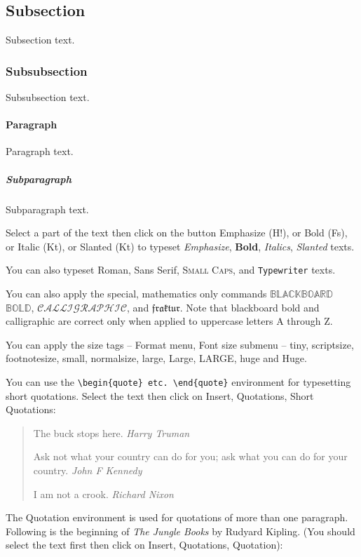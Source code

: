 \documentclass[11pt,a4paper]{amsart}
\theoremstyle{plain}
\numberwithin{equation}{section}
\theoremstyle{definition}
\begin{document}
\subsection{Subsection}
Subsection text.

\subsubsection{Subsubsection}
Subsubsection text.

\paragraph{Paragraph}
Paragraph text.

\subparagraph{Subparagraph}Subparagraph text.\vspace{2mm}

Select a part of the text then click on the button Emphasize (H!), or
Bold (Fs), or Italic (Kt), or Slanted (Kt) to typeset \emph{Emphasize},
\textbf{Bold}, \textit{Italics}, \textsl{Slanted} texts.

You can also typeset \textrm{Roman}, \textsf{Sans Serif}, \textsc{Small Caps},
and \texttt{Typewriter} texts.

You can also apply the special, mathematics only commands $\mathbb{BLACKBOARD}$
$\mathbb{BOLD}$, $\mathcal{CALLIGRAPHIC}$, and $\mathfrak{fraktur}$. Note that
blackboard bold and calligraphic are correct only when applied to uppercase
letters A through Z.

You can apply the size tags -- Format menu, Font size submenu -- {\tiny tiny},
{\scriptsize scriptsize}, {\footnotesize footnotesize}, {\small small},
{\normalsize normalsize}, {\large large}, {\Large Large}, {\LARGE LARGE},
{\huge huge} and {\Huge Huge}.

You can use the \verb"\begin{quote} etc. \end{quote}" environment for typesetting
short quotations. Select the text then click on Insert, Quotations, Short Quotations:

\begin{quote}
The buck stops here. \emph{Harry Truman}

Ask not what your country can do for you; ask what you can do for your
country. \emph{John F Kennedy}

I am not a crook. \emph{Richard Nixon}


\end{quote}

The Quotation environment is used for quotations of more than one paragraph. Following
is the beginning of \emph{The Jungle Books} by Rudyard Kipling. (You should select
the text first then click on Insert, Quotations, Quotation):
\end{document}
